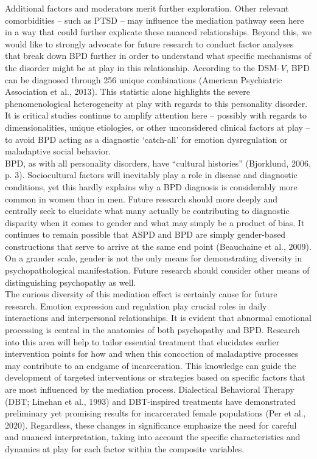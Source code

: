 \documentclass[
  man,floatsintext]{apa7}
\begin{document}
Additional factors and moderators merit further exploration. Other relevant comorbidities -- such as PTSD -- may influence the mediation pathway seen here in a way that could further explicate these nuanced relationships. Beyond this, we would like to strongly advocate for future research to conduct factor analyses that break down BPD further in order to understand what specific mechanisms of the disorder might be at play in this relationship. According to the DSM-\emph{V}, BPD can be diagnosed through 256 unique combinations (American Psychiatric Association et al., 2013). This statistic alone highlights the severe phenomenological heterogeneity at play with regards to this personality disorder. It is critical studies continue to amplify attention here -- possibly with regards to dimensionalities, unique etiologies, or other unconsidered clinical factors at play -- to avoid BPD acting as a diagnostic `catch-all' for emotion dysregulation or maladaptive social behavior.\\
BPD, as with all personality disorders, have ``cultural histories'' (Bjorklund, 2006, p. 3). Sociocultural factors will inevitably play a role in disease and diagnostic conditions, yet this hardly explains why a BPD diagnosis is considerably more common in women than in men. Future research should more deeply and centrally seek to elucidate what many actually be contributing to diagnostic disparity when it comes to gender and what may simply be a product of bias. It continues to remain possible that ASPD and BPD are simply gender-based constructions that serve to arrive at the same end point (Beauchaine et al., 2009). On a grander scale, gender is not the only means for demonstrating diversity in psychopathological manifestation. Future research should consider other means of distinguishing psychopathy as well.\\
The curious diversity of this mediation effect is certainly cause for future research. Emotion expression and regulation play crucial roles in daily interactions and interpersonal relationships. It is evident that abnormal emotional processing is central in the anatomies of both psychopathy and BPD. Research into this area will help to tailor essential treatment that elucidates earlier intervention points for how and when this concoction of maladaptive processes may contribute to an endgame of incarceration. This knowledge can guide the development of targeted interventions or strategies based on specific factors that are most influenced by the mediation process. Dialectical Behavioral Therapy (DBT; Linehan et al., 1993) and DBT-inspired treatments have demonstrated preliminary yet promising results for incarcerated female populations (Per et al., 2020). Regardless, these changes in significance emphasize the need for careful and nuanced interpretation, taking into account the specific characteristics and dynamics at play for each factor within the composite variables.\\
\end{document}
